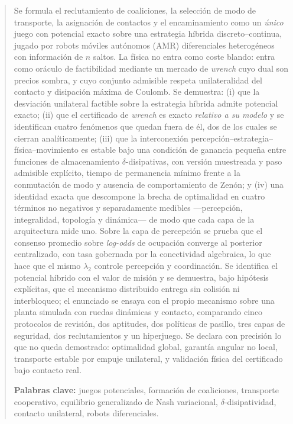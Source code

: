 \documentclass[11pt,a4paper]{article}
\theoremstyle{plain}
\theoremstyle{definition}
\theoremstyle{remark}
\begin{document}
\begin{abstract}
\noindent
Se formula el reclutamiento de coaliciones, la selección de modo de transporte,
la asignación de contactos y el encaminamiento como un \emph{único} juego con
potencial exacto sobre una estrategia híbrida discreto--continua, jugado por
robots móviles autónomos (AMR) diferenciales heterogéneos con información de
$n$ saltos. La física no entra como coste blando: entra como oráculo de
factibilidad mediante un mercado de \emph{wrench} cuyo dual son precios
sombra, y cuyo conjunto admisible respeta unilateralidad del contacto y
disipación máxima de Coulomb. Se demuestra: (i) que la desviación unilateral
factible sobre la estrategia híbrida admite potencial exacto; (ii) que el
certificado de \emph{wrench} es exacto \emph{relativo a su modelo} y se
identifican cuatro fenómenos que quedan fuera de él, dos de los cuales se
cierran analíticamente; (iii) que la interconexión percepción--estrategia--
física--movimiento es estable bajo una condición de ganancia pequeña entre
funciones de almacenamiento $\delta$-disipativas, con versión muestreada y
paso admisible explícito, tiempo de permanencia mínimo frente a la
conmutación de modo y ausencia de comportamiento de Zenón; y (iv) una identidad exacta que descompone la brecha
de optimalidad en cuatro términos no negativos y separadamente medibles
—percepción, integralidad, topología y dinámica— de modo que cada capa de la
arquitectura mide uno. Sobre la capa de percepción se prueba que el consenso
promedio sobre \emph{log-odds} de ocupación converge al posterior centralizado,
con tasa gobernada por la conectividad algebraica, lo que hace que el mismo
$\lambda_2$ controle percepción y coordinación. Se identifica el potencial híbrido
con el valor de misión y se demuestra, bajo hipótesis explícitas, que el mecanismo
distribuido entrega sin colisión ni interbloqueo; el enunciado se ensaya con el
propio mecanismo sobre una planta simulada con ruedas dinámicas y contacto,
comparando cinco protocolos de revisión, dos aptitudes, dos políticas de pasillo,
tres capas de seguridad, dos reclutamientos y un hiperjuego. Se declara con
precisión lo que no queda demostrado: optimalidad global, garantía angular no
local, transporte estable por empuje unilateral, y validación física del
certificado bajo contacto real.

\medskip
\noindent\textbf{Palabras clave:} juegos potenciales, formación de coaliciones,
transporte cooperativo, equilibrio generalizado de Nash variacional,
$\delta$-disipatividad, contacto unilateral, robots diferenciales.
\end{abstract}
\end{document}
